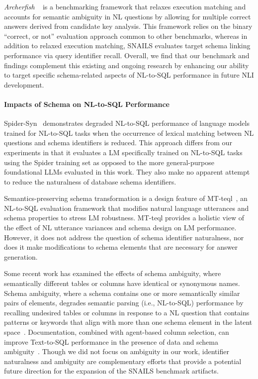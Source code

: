 \emph{Archerfish}
~\cite{floratou2024nl2sql} is a benchmarking framework that relaxes execution matching and accounts for semantic ambiguity in NL questions by allowing for multiple correct answers derived from candidate key analysis.
This framework relies on the binary ``correct, or not'' evaluation approach common to other benchmarks, whereas in addition to relaxed execution matching, SNAILS evaluates target schema linking performance via query identifier recall.
Overall, we find that our benchmark and findings complement this existing and ongoing research by enhancing our ability to target specific schema-related aspects of NL-to-SQL performance in future NLI development.

\paragraph{\textbf{Impacts of Schema on NL-to-SQL Performance}}
Spider-Syn~\cite{gan-etal-2021-towards} demonstrates degraded NL-to-SQL performance of language models trained for NL-to-SQL tasks when the occurrence of lexical matching between NL questions and schema identifiers is reduced. 
This approach differs from our experiments in that it evaluates a LM specifically trained on NL-to-SQL tasks using the Spider training set as opposed to the more general-purpose foundational LLMs evaluated in this work.
They also make no apparent attempt to reduce the naturalness of  database schema identifiers.

Semantics-preserving schema transformation is a design feature of MT-teql~\cite{10.14778/3494124.3494139}, an NL-to-SQL evaluation framework that modifies natural language utterances and schema properties to stress LM robustness.
MT-teql provides a holistic view of the effect of NL utterance variances and schema design on LM performance. 
However, it does not address the question of schema identifier naturalness, nor does it make modifications to schema elements that are necessary for answer generation. 

Some recent work has examined the effects of schema ambiguity, where semantically different tables or columns have identical or synonymous names.
Schema ambiguity, where a schema contains one or more semantically similar pairs of elements, degrades semantic parsing (i.e., NL-to-SQL) performance by recalling undesired tables or columns in response to a NL question that contains patterns or keywords that align with more than one schema element in the latent space~\cite{10555063}.
Documentation, combined with agent-based column selection, can improve Text-to-SQL performance in the presence of data and schema ambiguity~\cite{huang2023data}.
Though we did not focus on ambiguity in our work, identifier naturalness and ambiguity are complementary efforts that provide a potential future direction for the expansion of the SNAILS benchmark artifacts. 

